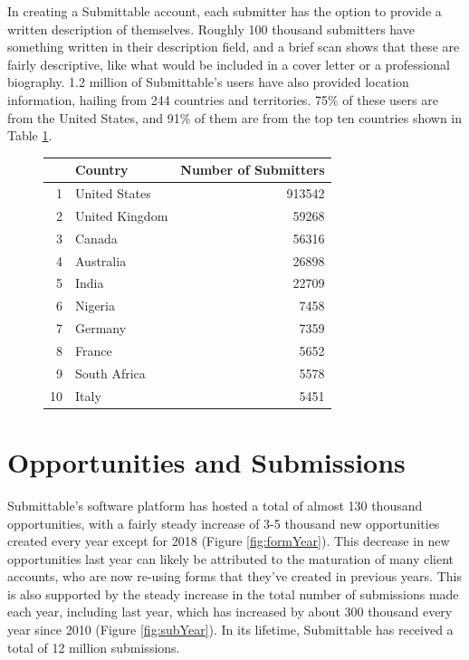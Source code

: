 \documentclass[12pt]{report}   %
\begin{document}
\FloatBarrier
In creating a Submittable account, each submitter has the option to provide a written description of themselves. Roughly 100 thousand submitters have something written in their description field, and a brief scan shows that these are fairly descriptive, like what would be included in a cover letter or a professional biography. 1.2 million of Submittable's users have also provided location information, hailing from 244 countries and territories. 75\% of these users are from the United States, and 91\% of them are from the top ten countries shown in Table \ref{table:userCountry}. 

\begin{figure}[h]
\centering
\begin{minipage}{0.45\textwidth}
	\captionsetup{font=scriptsize}
     \centering
{}
\label{table:userCountry}
\begin{tabular}{rlr}
  \hline
 & Country & Number of Submitters \\ 
  \hline
1 & United States & 913542 \\ 
  2 & United Kingdom & 59268 \\ 
  3 & Canada & 56316 \\ 
  4 & Australia & 26898 \\ 
  5 & India & 22709 \\ 
  6 & Nigeria & 7458 \\ 
  7 & Germany & 7359 \\ 
  8 & France & 5652 \\ 
  9 & South Africa & 5578 \\ 
  10 & Italy & 5451 \\ 
   \hline
\end{tabular}
    \end{minipage}
\end{figure}
\FloatBarrier

\section{Opportunities and Submissions}
Submittable's software platform has hosted a total of almost 130 thousand opportunities, with a fairly steady increase of 3-5 thousand new opportunities created every year except for 2018 (Figure \ref{fig:formYear}). This decrease in new opportunities last year can likely be attributed to the maturation of many client accounts, who are now re-using forms that they've created in previous years. This is also supported by the steady increase in the total number of submissions made each year, including last year, which has increased by about 300 thousand every year since 2010 (Figure \ref{fig:subYear}). In its lifetime, Submittable has received a total of 12 million submissions.
\end{document}
